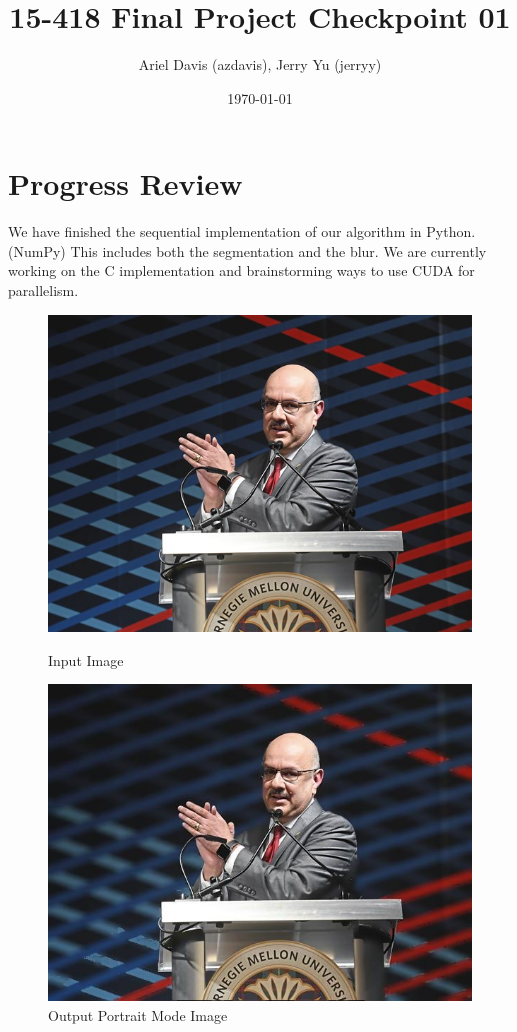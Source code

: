 \documentclass[12pt]{article}
\author{Ariel Davis (azdavis), Jerry Yu (jerryy)}
\date{\today}
\title{15-418 Final Project Checkpoint 01}
\begin{document}
\maketitle

\section{Progress Review}

We have finished the sequential implementation of our algorithm in Python.
(NumPy) This includes both the segmentation and the blur. We are currently
working on the C implementation and brainstorming ways to use CUDA for
parallelism.

\begin{figure}[!htb]
    \begin{minipage}{0.48\textwidth}
        \centering
        \includegraphics[width=0.9\linewidth]{farnam.jpg}
        \caption{Input Image}
    \end{minipage}\hfill
    \begin{minipage}{0.48\textwidth}
        \centering
        \includegraphics[width=0.9\linewidth]{farnam_portrait.jpg}
        \caption{Output Portrait Mode Image}
    \end{minipage}\hfill
\end{figure}
\end{document}
